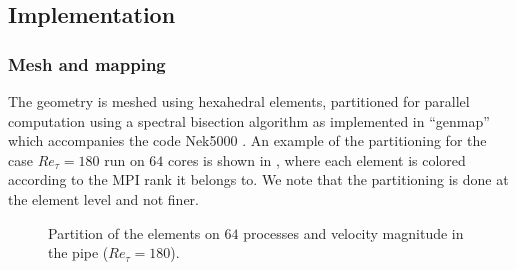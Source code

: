 \documentclass{sig-alternate}
\begin{document}


\subsection{Implementation}
\label{sec:implementation}

\subsubsection{Mesh and mapping}
\label{sec:code}
The geometry is meshed using hexahedral elements, partitioned for parallel
computation using a spectral bisection algorithm as implemented in ``genmap''
which accompanies the code Nek5000 \cite{argonne:nekdoc}. An example of the
partitioning for the case $Re_{\tau} = 180$ run on $64$ cores is shown in , where each element is colored according to the MPI rank it belongs to. We note that the partitioning is done at the element level and not finer.
\begin{figure}
  \centering
  \caption{Partition of the elements on $64$ processes and velocity magnitude in the pipe ($Re_{\tau}=180$).}
  \label{fig:partition}
\end{figure}
 
\end{document}
